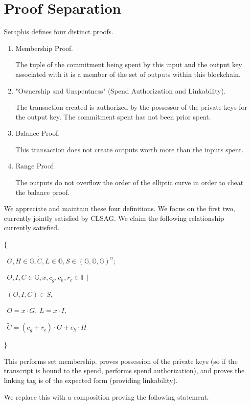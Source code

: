 \documentclass[]{article}
\begin{document}
\section{Proof Separation}

Seraphis defines four distinct proofs.

\begin{enumerate}
	\item
	Membership Proof.
	
	The tuple of the commitment being spent by this input and the output key associated with it is a member of the set of outputs within this blockchain.

	\item "Ownership and Unspentness" (Spend Authorization and Linkability).
	
	The transaction created is authorized by the possessor of the private keys for the output key. The commitment spent has not been prior spent.
	
	\item
	Balance Proof.
	
	This transaction does not create outputs worth more than the inputs spent.
	
	\item
	Range Proof.
	
	The outputs do not overflow the order of the elliptic curve in order to cheat the balance proof.
\end{enumerate}

We appreciate and maintain these four definitions. We focus on the first two, currently jointly satisfied by CLSAG. We claim the following relationship currently satisfied.

$\{$

$~~G, H \in \mathbb{G}, \tilde{C}, L \in \mathbb{G}, S \in (\mathbb{G}, \mathbb{G}, \mathbb{G})^n;$

$~~O, I, C \in \mathbb{G}, x, c_g, c_h, r_c \in \mathbb{F} ~|$

$~~(O, I, C) \in S,~$

$~~O = x \cdot G,~ L = x \cdot I,$

$~~\tilde{C} = (c_g + r_c) \cdot G + c_h \cdot H$

$\}$

This performs set membership, proves possession of the private keys (so if the transcript is bound to the spend, performs spend authorization), and proves the linking tag is of the expected form (providing linkability).

We replace this with a composition proving the following statement.
\end{document}
